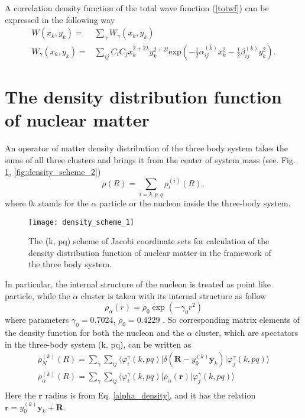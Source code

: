 \documentclass[
12pt, %
oneside, %
english, %
onehalfspacing, %
onehalfspacing, %
headsepline, %
]{MastersDoctoralThesis} %
\begin{document}
A correlation density function of the total wave function (\ref{totwf})  can be expressed in the following way
\begin{align}
W\left( x_k,y_k \right) =& \sum_{\gamma} W_{\gamma}\left( x_k,y_k \right) \nonumber \\
W_{\gamma}\left( x_k,y_k \right) =& \sum_{ij} C_i C_j x^{2+2\lambda}_k y^{2+2l}_k \text{exp}\left( - \tfrac{1}{2} \alpha^{(k)}_{ij} x_k^2 -  \tfrac{1}{2} \beta^{(k)}_{ij} y_k^2 \right) .
\end{align}

\section{The density distribution function of nuclear matter}
\label{section_density_function}

An operator of matter density distribution of the three body system takes the sums of all three clusters and brings it from the center of  system mass (see. Fig. \ref{fig:density_scheme_1}, \ref{fig:density_scheme_2})
\begin{equation}
\rho({R})=\sum_{\scriptscriptstyle{i}=k,p,q} \rho^{(i)}_{{\iota}}({R}),
\end{equation}
where $0{\iota}$ stands for the $\alpha$ particle or the nucleon inside the three-body system.

\begin{figure}[b]
\centering
\texttt{[image: density\_scheme\_1]}
\decoRule
\caption{\footnotesize The (k, pq) scheme of Jacobi coordinate sets for calculation of the density distribution function of nuclear matter in the framework of  the three body system.}
\label{fig:density_scheme_1}
\end{figure}

In particular,  the internal structure of the nucleon is treated as point like particle, while the $\alpha$ cluster  is taken  with its internal structure as follow
\begin{equation}
\rho_\alpha(r)=\rho_0 \exp\left(-\gamma_0 r^2 \right)
\label{alpha_density}
\end{equation}
 where parameters $ \gamma_0= 0.7024$, $  \displaystyle \rho_0=0.4229$ \cite{satchler1979folding}. So corresponding matrix elements of the density function for both the nucleon and the $\alpha$ cluster, which are spectators in the three-body system (k, pq), can be written as 
\begin{equation}
\label{densities}
\begin{gathered}
\rho_{N}^{(k)}({R})=
\sum_{\gamma}
\sum_{ij}
\langle\varphi^{{\gamma}}_i(k, pq) 
\vert \delta(\textbf{R}-y_0^{(k)}\textbf{y}_k)
\vert \varphi^{{\gamma}}_j(k, pq)\rangle \\
\rho_{\alpha}^{(k)}({R})= 
\sum_{\gamma}
\sum_{ij}
\langle\varphi^{{\gamma}}_i(k, pq) 
\vert \rho_{\alpha}(\textbf{r}) 
\vert \varphi^{{\gamma}}_j(k, pq)\rangle \\
\end{gathered}
\end{equation}
Here the $\textbf{r}$ radius is from Eq. \ref{alpha_density}, and it has the relation  $\textbf{r}=y_0^{(k)}\textbf{y}_k+\textbf{R}$.
\end{document}
